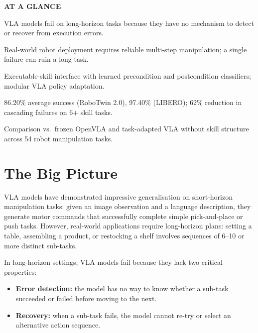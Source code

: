 \documentclass[10pt,twocolumn]{article}
\begin{document}
\begin{mdframed}[backgroundcolor=boxgray,linecolor=rulered,linewidth=1pt,
    innerleftmargin=6pt,innerrightmargin=6pt,
    innertopmargin=6pt,innerbottommargin=6pt]
\textbf{\small AT A GLANCE}\par\vspace{4pt}
\begin{description}[leftmargin=0pt,labelsep=4pt,itemsep=2pt,parsep=0pt,
    font=\small\bfseries]
  \item[Problem:] VLA models fail on long-horizon tasks because they
    have no mechanism to detect or recover from execution errors.
  \item[Why it matters:] Real-world robot deployment requires reliable
    multi-step manipulation; a single failure can ruin a long task.
  \item[Method:] Executable-skill interface with learned precondition
    and postcondition classifiers; modular VLA policy adaptation.
  \item[Result:] 86.20\% average success (RoboTwin 2.0), 97.40\%
    (LIBERO); 62\% reduction in cascading failures on 6+ skill tasks.
  \item[Evidence:] Comparison vs.\ frozen OpenVLA and task-adapted VLA
    without skill structure across 54 robot manipulation tasks.
\end{description}
\end{mdframed}

\section{The Big Picture}

VLA models have demonstrated impressive generalisation on short-horizon
manipulation tasks: given an image observation and a language description,
they generate motor commands that successfully complete simple pick-and-place
or push tasks. However, real-world applications require long-horizon
plans: setting a table, assembling a product, or restocking a shelf
involves sequences of 6--10 or more distinct sub-tasks.

In long-horizon settings, VLA models fail because they lack two critical
properties:
\begin{itemize}[itemsep=2pt,parsep=0pt]
  \item \textbf{Error detection:} the model has no way to know whether
    a sub-task succeeded or failed before moving to the next.
  \item \textbf{Recovery:} when a sub-task fails, the model cannot
    re-try or select an alternative action sequence.
\end{itemize}
\end{document}
